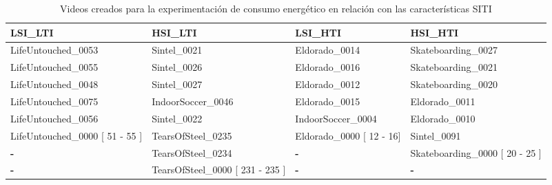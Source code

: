 \begin{table}[h!]

 \centering

 \small   %

 \begin{tabularx}{\textwidth}{|>{\centering\arraybackslash}X|>{\centering\arraybackslash}X|>{\centering\arraybackslash}X|>{\centering\arraybackslash}X|}

 \hline

 \rowcolor[HTML]{C0C0C0}

 \textbf{LSI\_LTI} & \textbf{HSI\_LTI} & \textbf{LSI\_HTI} & \textbf{HSI\_HTI} \\

 \hline

 LifeUntouched\_0053                 & Sintel\_0021                         & Eldorado\_0014                & Skateboarding\_0027                 \\ \hline

 LifeUntouched\_0055                 & Sintel\_0026                         & Eldorado\_0016                & Skateboarding\_0021                 \\ \hline

 LifeUntouched\_0048                 & Sintel\_0027                         & Eldorado\_0012                & Skateboarding\_0020                 \\ \hline

 LifeUntouched\_0075                 & IndoorSoccer\_0046                   & Eldorado\_0015                & Eldorado\_0011                      \\ \hline

 LifeUntouched\_0056                 & Sintel\_0022                         & IndoorSoccer\_0004            & Eldorado\_0010                      \\ \hline

 LifeUntouched\_0000 {[} 51 - 55 {]} & TearsOfSteel\_0235                   & Eldorado\_0000 {[} 12 - 16{]} & Sintel\_0091                        \\ \hline

 \textbf{-}                          & TearsOfSteel\_0234                   & \textbf{-}                    & Skateboarding\_0000 {[} 20 - 25 {]} \\ \hline

 \textbf{-}                          & TearsOfSteel\_0000 {[} 231 - 235 {]} & \textbf{-}                    & \textbf{-}                          \\ \hline

 \end{tabularx}

 \caption{Videos creados para la experimentación de consumo energético en relación con las características SITI}

 \label{tab:exp2.2-videos}

\end{table}

